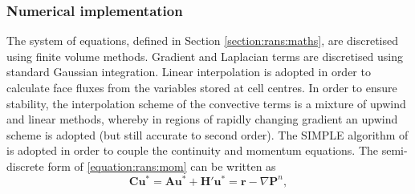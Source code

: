 \documentclass[12pt,oneside,a4paper]{article}
\newcommand{\vect}[1]{\boldsymbol{#1}}
\begin{document}
\subsubsection{Numerical implementation}
The system of equations, defined in Section \ref{section:rans:maths}, are discretised using finite volume methods. Gradient and Laplacian terms are discretised using standard Gaussian integration. Linear interpolation is adopted in order to calculate face fluxes from the variables stored at cell centres. In order to ensure stability, the interpolation scheme of the convective terms is a mixture of upwind and linear methods, whereby in regions of rapidly changing gradient an upwind scheme is adopted (but still accurate to second order). The SIMPLE algorithm of \cite{caretto1973} is adopted in order to couple the continuity and momentum equations. The semi-discrete form of \eqref{equation:rans:mom} can be written as
\begin{equation}
\label{equation:piso1}
\vect{C} \vect{u}^* =  \vect{A}\vect{u}^* + \vect{H'}\vect{u}^* =\vect{r} - \nabla \vect{P}^n,
\end{equation}
\end{document}
